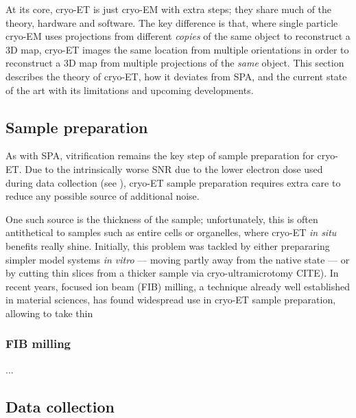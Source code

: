 At its core, cryo-ET is just cryo-EM with extra steps; they share much of the theory, hardware and software.
The key difference is that, where single particle cryo-EM uses projections from different \textit{copies} of the same object to reconstruct a 3D map, cryo-ET images the same location from multiple orientations in order to reconstruct a 3D map from multiple projections of the \textit{same} object.
This section describes the theory of cryo-ET, how it deviates from SPA, and the current state of the art with its limitations and upcoming developments.

\subsection{Sample preparation}
As with SPA, vitrification remains the key step of sample preparation for cryo-ET.
Due to the intrinsically worse SNR due to the lower electron dose used during data collection (see ), cryo-ET sample preparation requires extra care to reduce any possible source of additional noise.

One such source is the thickness of the sample; unfortunately, this is often antithetical to samples such as entire cells or organelles, where cryo-ET \textit{in situ} benefits really shine.
Initially, this problem was tackled by either prepararing simpler model systems \textit{in vitro} --- moving partly away from the native state --- or by cutting thin slices from a thicker sample via cryo-ultramicrotomy CITE).
In recent years, focused ion beam (FIB) milling, a technique already well established in material sciences, has found widespread use in cryo-ET sample preparation, allowing to take thin

\subsubsection{FIB milling}
...

\subsection{Data collection}\label{et_data_collection}

\newpage

\FloatBarrier

